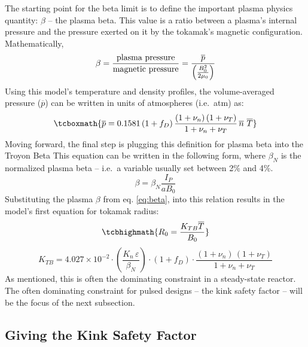The starting point for the beta limit is to define the important plasma physics quantity: $\beta$ -- the plasma beta. This value is a ratio between a plasma's internal pressure and the pressure exerted on it by the tokamak's magnetic configuration. Mathematically, \cite{jeff}
\begin{equation}
	\label{eq:beta}
	\beta = \frac{\textnormal{plasma pressure}}{\textnormal{magnetic pressure}} = \frac{ \overline p }{ \left( \frac{B_0^2}{2 \mu_0} \right) }
\end{equation}
Using this model's temperature and density profiles, the volume-averaged pressure ($\overline p$) can be written in units of atmospheres (i.e.\ atm) as:
\begin{equation}
\tcboxmath{
  \overline{p} = 0.1581 \, ( 1 + f_D ) \, \frac{ (1 + \nu_n) \, (1 + \nu_T) }{1 + \nu_n + \nu_T } \, \overline{n} \ \overline{T}
  }
\end{equation}
Moving forward, the final step is plugging this definition for plasma beta into the Troyon Beta  This equation can be written in the following form, where $\beta_N$ is the normalized plasma beta -- i.e.\ a  variable usually set between 2\% and 4\%. \cite{hartmann}
\begin{equation}
	\beta = \beta_N \frac{ I_P }{ a B_0 }
\end{equation}
Substituting the plasma $\beta$ from eq. \ref{eq:beta}, into this relation results in the model's first equation for tokamak radius:
\begin{equation}
  \label{eq:r_beta}
  \tcbhighmath{ R_0 = \frac{ K_{TB} \overline{T} }{ B_0 } }
\end{equation}
\begin{equation}
  K_{TB} = 4.027 \times 10^{-2} \cdot  \left( \frac{K_n \, \varepsilon}{\beta_N} \right) \cdot ( 1 + f_D ) \cdot \frac{ (1 + \nu_n) \, (1 + \nu_T) }{1 + \nu_n + \nu_T }
\end{equation}
As mentioned, this is often the dominating constraint in a steady-state reactor. The often dominating constraint for pulsed designs -- the kink safety factor -- will be the focus of the next subsection.

\subsection{Giving the Kink Safety Factor}

